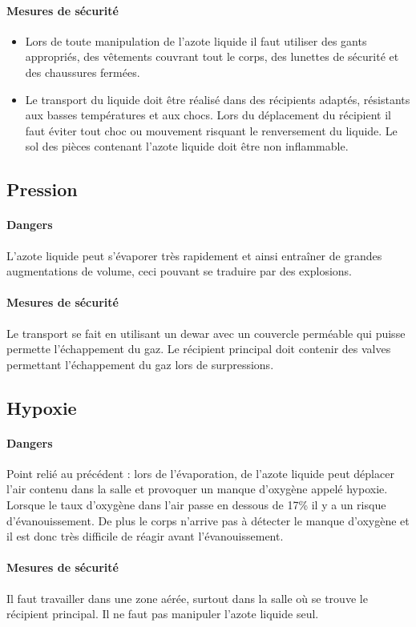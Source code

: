 \paragraph{Mesures de sécurité}

\begin{itemize}
  \item Lors de toute manipulation de l'azote liquide il faut utiliser des gants appropriés, des vêtements couvrant tout le corps, des lunettes de sécurité et des chaussures fermées.
  \item Le transport du liquide doit être réalisé dans des récipients adaptés, résistants aux basses températures et aux chocs. Lors du déplacement du récipient il faut éviter tout choc ou mouvement risquant le renversement du liquide. Le sol des pièces contenant l'azote liquide doit être non inflammable.
\end{itemize}

\subsection{Pression}

\paragraph{Dangers}

L'azote liquide peut s'évaporer très rapidement et ainsi entraîner de grandes augmentations de volume, ceci pouvant se traduire par des explosions.
\paragraph{Mesures de sécurité}

Le transport se fait en utilisant un dewar avec un couvercle perméable qui puisse permette l'échappement du gaz. Le récipient principal doit contenir des valves permettant l'échappement du gaz lors de surpressions.

\subsection{Hypoxie}

\paragraph{Dangers}

Point relié au précédent : lors de l'évaporation, de l'azote liquide peut déplacer l'air contenu dans la salle et provoquer un manque d'oxygène appelé hypoxie. Lorsque le taux d'oxygène dans l'air passe en dessous de 17\% il y a un risque d'évanouissement. De plus le corps n'arrive pas à détecter le manque d'oxygène et il est donc très difficile de réagir avant l'évanouissement.
\paragraph{Mesures de sécurité}

Il faut travailler dans une zone aérée, surtout dans la salle où se trouve le récipient principal. Il ne faut pas manipuler l'azote liquide seul.
